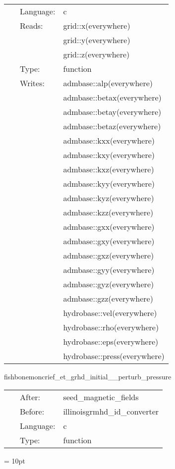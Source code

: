  \begin{tabular*}{160mm}{cll} 
~ & Language:  & c \\ 
~ & Reads:  & grid::x(everywhere) \\ 
~& ~ &grid::y(everywhere)\\ 
~& ~ &grid::z(everywhere)\\ 
~ & Type:  & function \\ 
~ & Writes:  & admbase::alp(everywhere) \\ 
~& ~ &admbase::betax(everywhere)\\ 
~& ~ &admbase::betay(everywhere)\\ 
~& ~ &admbase::betaz(everywhere)\\ 
~& ~ &admbase::kxx(everywhere)\\ 
~& ~ &admbase::kxy(everywhere)\\ 
~& ~ &admbase::kxz(everywhere)\\ 
~& ~ &admbase::kyy(everywhere)\\ 
~& ~ &admbase::kyz(everywhere)\\ 
~& ~ &admbase::kzz(everywhere)\\ 
~& ~ &admbase::gxx(everywhere)\\ 
~& ~ &admbase::gxy(everywhere)\\ 
~& ~ &admbase::gxz(everywhere)\\ 
~& ~ &admbase::gyy(everywhere)\\ 
~& ~ &admbase::gyz(everywhere)\\ 
~& ~ &admbase::gzz(everywhere)\\ 
~& ~ &hydrobase::vel(everywhere)\\ 
~& ~ &hydrobase::rho(everywhere)\\ 
~& ~ &hydrobase::eps(everywhere)\\ 
~& ~ &hydrobase::press(everywhere)\\ 
\end{tabular*} 


\vspace{5mm}


\hspace{5mm} fishbonemoncrief\_et\_grhd\_initial\_\_perturb\_pressure 

\hspace{5mm}{\it add random perturbation to initial pressure, after seed magnetic fields have been set up (in case we'd like the seed magnetic fields to depend on the pristine pressures) } 


\hspace{5mm}

 \begin{tabular*}{160mm}{cll} 
~ & After:  & seed\_magnetic\_fields \\ 
~ & Before:  & illinoisgrmhd\_id\_converter \\ 
~ & Language:  & c \\ 
~ & Type:  & function \\ 
\end{tabular*} 



\vspace{5mm}\parskip = 10pt 
